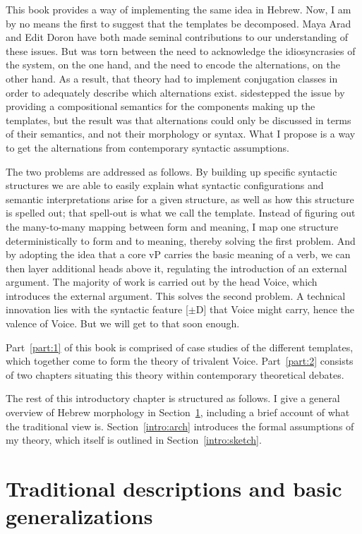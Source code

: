 \begin{exe}
\begin{xlist}
\begin{exe}
\begin{exe}
\begin{exe}
\begin{exe}
\begin{xlist}
\begin{exe}
\begin{xlist}
\begin{xlist}
\begin{xlist}
\begin{exe}
\begin{xlist}
This book provides a way of implementing the same idea in Hebrew. Now, I am by no means the first to suggest that the templates be decomposed. Maya Arad and Edit Doron have both made seminal contributions to our understanding of these issues. But \cite{arad05} was torn between the need to acknowledge the idiosyncrasies of the system, on the one hand, and the need to encode the alternations, on the other hand. As a result, that theory had to implement conjugation classes in order to adequately describe which alternations exist. \cite{doron03} sidestepped the issue by providing a compositional semantics for the components making up the templates, but the result was that alternations could only be discussed in terms of their semantics, and not their morphology or syntax. What I propose is a way to get the alternations from contemporary syntactic assumptions.

The two problems are addressed as follows. By building up specific syntactic structures we are able to easily explain what syntactic configurations and semantic interpretations arise for a given structure, as well as how this structure is spelled out; that spell-out is what we call the template. Instead of figuring out the many-to-many mapping between form and meaning, I map one structure deterministically to form and to meaning, thereby solving the first problem. And by adopting the idea that a core vP carries the basic meaning of a verb, we can then layer additional heads above it, regulating the introduction of an external argument. The majority of work is carried out by the head Voice, which introduces the external argument. This solves the second problem. A technical innovation lies with the syntactic feature [$\pm$D] that Voice might carry, hence the valence of Voice. But we will get to that soon enough.

Part~\ref{part:1} of this book is comprised of case studies of the different templates, which together come to form the theory of trivalent Voice. Part~\ref{part:2} consists of two chapters situating this theory within contemporary theoretical debates.

The rest of this introductory chapter is structured as follows. I give a general overview of Hebrew morphology in Section~\ref{intro:basic}, including a brief account of what the traditional view is. Section~\ref{intro:arch} introduces the formal assumptions of my theory, which itself is outlined in Section~\ref{intro:sketch}.


\section{Traditional descriptions and basic generalizations} \label{intro:basic}

\end{xlist}
\end{exe}
\end{xlist}
\end{xlist}
\end{xlist}
\end{exe}
\end{xlist}
\end{exe}
\end{exe}
\end{exe}
\end{exe}
\end{xlist}
\end{exe}
